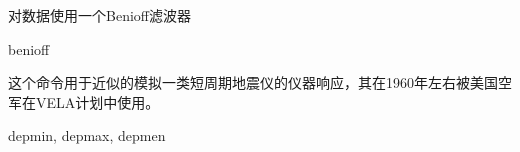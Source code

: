 \label{cmd:benioff}

对数据使用一个Benioff滤波器

\begin{SACSTX}
benioff
\end{SACSTX}

这个命令用于近似的模拟一类短周期地震仪的仪器响应，其在1960年左右被美国空军在VELA计划中使用。

depmin, depmax, depmen
